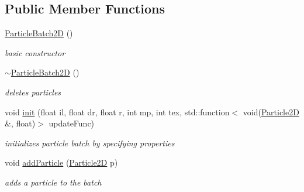 \subsection*{Public Member Functions}
\begin{DoxyCompactItemize}
\item 
\mbox{\label{classnta_1_1ParticleBatch2D_af81efd4598cd578c2eddbcab6b5d3f5d}} 
\hyperlink{classnta_1_1ParticleBatch2D_af81efd4598cd578c2eddbcab6b5d3f5d}{Particle\+Batch2D} ()
\begin{DoxyCompactList}\small\item\em basic constructor \end{DoxyCompactList}\item 
\mbox{\label{classnta_1_1ParticleBatch2D_ac21b6437fdd8e746c6fce095b4dbc03a}} 
\hyperlink{classnta_1_1ParticleBatch2D_ac21b6437fdd8e746c6fce095b4dbc03a}{$\sim$\+Particle\+Batch2D} ()
\begin{DoxyCompactList}\small\item\em deletes particles \end{DoxyCompactList}\item 
\mbox{\label{classnta_1_1ParticleBatch2D_a328f04a39eb9baa821ad95b2f455a7b0}} 
void \hyperlink{classnta_1_1ParticleBatch2D_a328f04a39eb9baa821ad95b2f455a7b0}{init} (float il, float dr, float r, int mp, int tex, std\+::function$<$ void(\hyperlink{structnta_1_1Particle2D}{Particle2D} \&, float)$>$ update\+Func)
\begin{DoxyCompactList}\small\item\em initializes particle batch by specifying properties \end{DoxyCompactList}\item 
\mbox{\label{classnta_1_1ParticleBatch2D_aeb80340cf60145569e7d30e5e25fd9c0}} 
void \hyperlink{classnta_1_1ParticleBatch2D_aeb80340cf60145569e7d30e5e25fd9c0}{add\+Particle} (\hyperlink{structnta_1_1Particle2D}{Particle2D} p)
\begin{DoxyCompactList}\small\item\em adds a particle to the batch \end{DoxyCompactList}\item 
\mbox{\label{classnta_1_1ParticleBatch2D_a270e573b2a767bf32fde34d17d838e69}} 

\end{DoxyCompactItemize}
